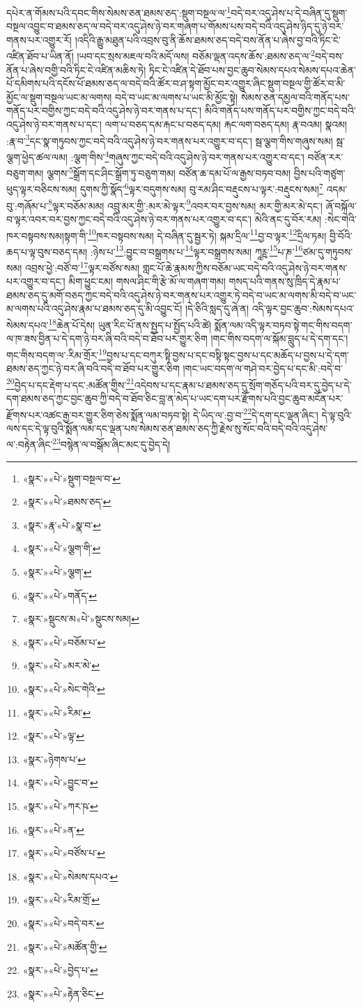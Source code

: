 དཔེར་ན་གོམས་པའི་དབང་གིས་སེམས་ཅན་ཐམས་ཅད་:སྡུག་བསྔལ་ལ་\footnote{«སྣར་»«པེ་»སྡུག་བསྔལ་བ་}བདེ་བར་འདུ་ཤེས་པ་དེ་བཞིན་དུ་སྡུག་བསྔལ་འབྱུང་བ་ཐམས་ཅད་ལ་བདེ་བར་འདུ་ཤེས་ཉེ་བར་གཞག་པ་གོམས་པས་བདེ་བའི་འདུ་ཤེས་ཉིད་དུ་ཉེ་བར་གནས་པར་འགྱུར་རོ། །འདིའི་རྒྱུ་མཐུན་པའི་འབྲས་བུ་ནི་ཆོས་ཐམས་ཅད་བདེ་བས་ནོན་པ་ཞེས་བྱ་བའི་ཏིང་ངེ་འཛིན་ཐོབ་པ་ཡིན་ནོ། །ཡབ་དང་སྲས་མཇལ་བའི་མདོ་ལས། བཅོམ་ལྡན་འདས་ཆོས་:ཐམས་ཅད་ལ་\footnote{«སྣར་»«པེ་»ཐམས་ཅད་}བདེ་བས་ནོན་པ་ཞེས་བགྱི་བའི་ཏིང་ངེ་འཛིན་མཆིས་ཏེ། ཏིང་ངེ་འཛིན་དེ་ཐོབ་པས་བྱང་ཆུབ་སེམས་དཔའ་སེམས་དཔའ་ཆེན་པོ་དམིགས་པའི་དངོས་པོ་ཐམས་ཅད་ལ་བདེ་བའི་ཚོར་བ་ཤ་སྟག་མྱོང་བར་འགྱུར་ཞིང་སྡུག་བསྔལ་གྱི་ཚོར་བ་མི་མྱོང་ལ་སྡུག་བསྔལ་ཡང་མ་ལགས། བདེ་བ་ཡང་མ་ལགས་པ་ཡང་མི་མྱོང་སྟེ། སེམས་ཅན་དམྱལ་བའི་གནོད་པས་གནོད་པར་བགྱིས་ཀྱང་བདེ་བའི་འདུ་ཤེས་ཉེ་བར་གནས་པ་དང་། མིའི་གནོད་པས་གནོད་པར་བགྱིས་ཀྱང་བདེ་བའི་འདུ་ཤེས་ཉེ་བར་གནས་པ་དང་། ལག་པ་བཅད་དམ་རྐང་པ་བཅད་དམ། རྐང་ལག་བཅད་དམ། རྣ་བའམ། སྣའམ། :རྣ་བ་\footnote{«སྣར་»རྣ་«པེ་»སྣ་བ་}དང་སྣ་གཏུབས་ཀྱང་བདེ་བའི་འདུ་ཤེས་ཉེ་བར་གནས་པར་འགྱུར་བ་དང་། སྦ་ལྕག་གིས་གཞུས་སམ། སྦ་ལྕག་ཕྱེད་ཚལ་ལམ། :ལྕག་གིས་\footnote{«སྣར་»«པེ་»ལྕག་གི་}གཞུས་ཀྱང་བདེ་བའི་འདུ་ཤེས་ཉེ་བར་གནས་པར་འགྱུར་བ་དང་། བཙོན་རར་བཅུག་གམ། ལྕགས་\footnote{«སྣར་»«པེ་»ལྕག་}སྒྲོག་དང་ཤིང་སྒྲོག་ཏུ་བཅུག་གམ། བཙོན་ཆ་དམ་པོ་ལ་རྒྱས་བཏབ་བམ། བྱིས་པའི་གཙུག་ཕུད་ལྟར་བཅིངས་སམ། དུགས་ཀྱི་སྣོད་\footnote{«སྣར་»«པེ་»གནོད་}ལྟར་བདུགས་སམ། བུ་རམ་ཤིང་བརྡུངས་པ་ལྟར་:བརྡུངས་སམ།\footnote{«སྣར་»སྡུངས་མ«པེ་»སྡུངས་སམ།} འདམ་བུ་:གཞོམ་པ་\footnote{«སྣར་»«པེ་»བཅོམ་པ་}ལྟར་བཅོམ་མམ། འབྲུ་མར་གྱི་:མར་མེ་ལྟར་\footnote{«སྣར་»«པེ་»མར་མེ་}འབར་བར་བྱས་སམ། མར་གྱི་མར་མེ་དང་། ཞོ་བསྐོལ་བ་ལྟར་འབར་བར་བྱས་ཀྱང་བདེ་བའི་འདུ་ཤེས་ཉེ་བར་གནས་པར་འགྱུར་བ་དང་། མེའི་ནང་དུ་བོར་རམ། :སེང་གེའི་ཁར་བསྟབས་སམ།སྟག་གི་\footnote{«སྣར་»«པེ་»སེང་གེའི་}ཁར་བསྟབས་སམ། དེ་བཞིན་དུ་སྦྱར་ཏེ། སྐམ་དྲིལ་\footnote{«སྣར་»«པེ་»རིམ་}བྱ་བ་ལྟར་\footnote{«སྣར་»«པེ་»ལྟ་}དྲིལ་ཏམ། བྱི་བོའི་ཆད་པ་ལྟ་བུས་བཅད་དམ། :ཉེས་པ་\footnote{«སྣར་»ཉེགས་པ་}:བྱུང་བ་བསྒྲགས་པ་\footnote{«སྣར་»«པེ་»བྱུང་བ་}ལྟར་བསྒྲགས་སམ། ཀཱཪྵ་\footnote{«སྣར་»«པེ་»ཀར་ཥ་}པ་ཎ་\footnote{«སྣར་»«པེ་»ན་}ཙམ་དུ་གཏུབས་སམ། འབྲས་ཕྱེ་:བཙོ་བ་\footnote{«སྣར་»«པེ་»བཙོས་པ་}ལྟར་བཙོས་སམ། གླང་པོ་ཆེ་རྣམས་ཀྱིས་བཅོམ་ཡང་བདེ་བའི་འདུ་ཤེས་ཉེ་བར་གནས་པར་འགྱུར་བ་དང་། མིག་ཕྱུང་ངམ། གསལ་ཤིང་གི་རྩེ་མོ་ལ་གཞག་གམ། གསད་པའི་གནས་སུ་ཁྲིད་དེ་རྣམ་པ་ཐམས་ཅད་དུ་མགོ་བཅད་ཀྱང་བདེ་བའི་འདུ་ཤེས་ཉེ་བར་གནས་པར་འགྱུར་ཏེ་བདེ་བ་ཡང་མ་ལགས་མི་བདེ་བ་ཡང་མ་ལགས་པའི་འདུ་ཤེས་རྣམ་པ་ཐམས་ཅད་དུ་མི་འབྱུང་ངོ། །དེ་ཅིའི་སླད་དུ་ཞེ་ན། འདི་ལྟར་བྱང་ཆུབ་:སེམས་དཔའ་སེམས་དཔའ་\footnote{«སྣར་»«པེ་»སེམས་དཔའ་}ཆེན་པོ་དེས། ཡུན་རིང་པོ་ནས་སྤྱད་པ་སྤྱོད་པའི་ཚེ། སྨོན་ལམ་འདི་ལྟར་བཏབ་སྟེ་གང་གིས་བདག་ལ་ཁ་ཟས་བྱིན་པ་དེ་དག་ཉེ་བར་ཞི་བའི་བདེ་བ་ཐོབ་པར་གྱུར་ཅིག །གང་གིས་བདག་ལ་སྐོམ་བླུད་པ་དེ་དག་དང་། གང་གིས་བདག་ལ་:རིམ་གྲོར་\footnote{«སྣར་»«པེ་»རིམ་གྲོ་}བྱས་པ་དང་བཀུར་སྟི་བྱས་པ་དང་བསྟི་སྟང་བྱས་པ་དང་མཆོད་པ་བྱས་པ་དེ་དག་ཐམས་ཅད་ཀྱང་ཉེ་བར་ཞི་བའི་བདེ་བ་ཐོབ་པར་གྱུར་ཅིག །གང་ཡང་བདག་ལ་གཤེ་བར་བྱེད་པ་དང་མི་:བདེ་བ་\footnote{«སྣར་»«པེ་»བདེ་བར་}བྱེད་པ་དང་རྡེག་པ་དང་:མཚོན་གྱིས་\footnote{«སྣར་»«པེ་»མཚོན་གྱི་}འདེབས་པ་དང་རྣམ་པ་ཐམས་ཅད་དུ་སྲོག་གཅོད་པའི་བར་དུ་བྱེད་པ་དེ་དག་ཐམས་ཅད་ཀྱང་བྱང་ཆུབ་ཀྱི་བདེ་བ་ཐོབ་ཅིང་བླ་ན་མེད་པ་ཡང་དག་པར་རྫོགས་པའི་བྱང་ཆུབ་མངོན་པར་རྫོགས་པར་འཚང་རྒྱ་བར་གྱུར་ཅིག་ཅེས་སྨོན་ལམ་བཏབ་སྟེ། དེ་ཡིད་ལ་:བྱ་བ་\footnote{«སྣར་»«པེ་»བྱེད་པ་}དེ་དག་དང་ལྡན་ཞིང་། དེ་ལྟ་བུའི་ལས་དང་དེ་ལྟ་བུའི་སྨོན་ལམ་དང་ལྡན་པས་སེམས་ཅན་ཐམས་ཅད་ཀྱི་རྗེས་སུ་སོང་བའི་བདེ་བའི་འདུ་ཤེས་ལ་:བརྟེན་ཞིང་\footnote{«སྣར་»«པེ་»རྟེན་ཅིང་}བསྙེན་ལ་བསྒོམ་ཞིང་མང་དུ་བྱེད་དེ། 